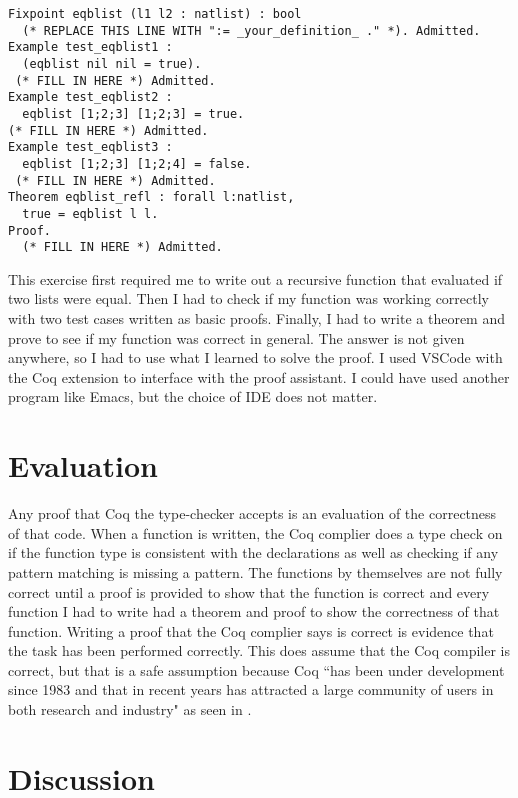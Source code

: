 \documentclass[10pt,twocolumn]{article}
\begin{document}
\begin{lstlisting}
Fixpoint eqblist (l1 l2 : natlist) : bool
  (* REPLACE THIS LINE WITH ":= _your_definition_ ." *). Admitted.
Example test_eqblist1 :
  (eqblist nil nil = true).
 (* FILL IN HERE *) Admitted.
Example test_eqblist2 :
  eqblist [1;2;3] [1;2;3] = true.
(* FILL IN HERE *) Admitted.
Example test_eqblist3 :
  eqblist [1;2;3] [1;2;4] = false.
 (* FILL IN HERE *) Admitted.
Theorem eqblist_refl : forall l:natlist,
  true = eqblist l l.
Proof.
  (* FILL IN HERE *) Admitted.
\end{lstlisting}

This exercise first required me to write out a recursive function that evaluated if two lists were equal. Then I had to check if my function was working correctly with two test cases written as basic proofs. Finally, I had to write a theorem and prove to see if my function was correct in general. The answer is not given anywhere, so I had to use what I learned to solve the proof. I used VSCode with the Coq extension to interface with the proof assistant. I could have used another program like Emacs, but the choice of IDE does not matter.

\section{Evaluation}

Any proof that Coq the type-checker accepts is an evaluation of the correctness of that code. When a function is written, the Coq complier does a type check on if the function type is consistent with the declarations as well as checking if any pattern matching is missing a pattern. The functions by themselves are not fully correct until a proof is provided to show that the function is correct and every function I had to write had a theorem and proof to show the correctness of that function. Writing a proof that the Coq complier says is correct is evidence that the task has been performed correctly. This does assume that the Coq compiler is correct, but that is a safe assumption because Coq ``has been under development since 1983 and that in recent years has attracted a large community of users in both research and industry" as seen in \textcite{Pierce2021Software}.

\section{Discussion}
\end{document}
